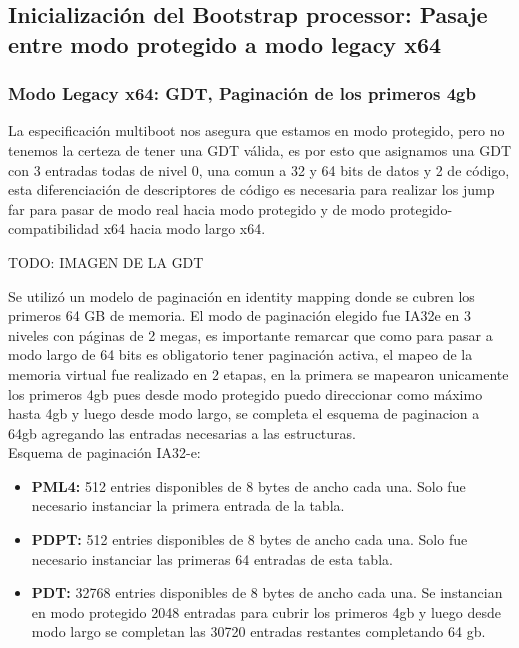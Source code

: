 \subsection{Inicialización del Bootstrap processor: Pasaje entre modo protegido a modo legacy x64}
    \subsubsection{Modo Legacy x64: GDT, Paginación de los primeros 4gb}
    La especificación multiboot nos asegura que estamos en modo protegido, pero no tenemos la certeza de tener una GDT válida, es por esto que asignamos una GDT con 
    3 entradas todas de nivel 0, una comun a 32 y 64 bits de datos y 2 de código, esta diferenciación de descriptores de código es necesaria para realizar los jump far para pasar de modo real hacia modo protegido y de modo protegido-compatibilidad x64 hacia modo largo x64.

    TODO: IMAGEN DE LA GDT

    Se utilizó un modelo de paginación en identity mapping donde se cubren los primeros 64 GB de memoria. El modo de paginación elegido fue IA32e en 3 niveles con páginas de 2 megas, es importante remarcar que como para pasar a modo largo de 64 bits es obligatorio tener paginación activa, el mapeo de la memoria virtual fue realizado en 2 etapas, en la primera se mapearon unicamente los primeros 4gb pues desde modo protegido puedo direccionar como máximo hasta 4gb y luego desde modo largo, se completa el esquema de paginacion a 64gb agregando las entradas necesarias a las estructuras.
    \\

    Esquema de paginación IA32-e:

    \begin{itemize}

        \item \textbf{PML4: } 512 entries disponibles de 8 bytes de ancho cada una. Solo fue necesario instanciar la primera entrada de la tabla.

        \item \textbf{PDPT: } 512 entries disponibles de 8 bytes de ancho cada una. 
        Solo fue necesario instanciar las primeras 64 entradas de esta tabla.

        \item \textbf{PDT: } 32768 entries disponibles de 8 bytes de ancho cada una.
        Se instancian en modo protegido 2048 entradas para cubrir los primeros 4gb y luego desde modo largo se completan las 30720 entradas restantes completando 64 gb.
    \end{itemize}

